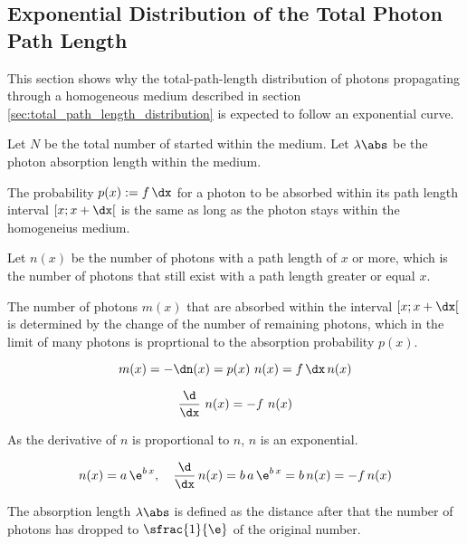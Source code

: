 
\subsection{Exponential Distribution of the Total Photon Path Length}
\label{sec:exponential_distribution}

This section shows why the total-path-length distribution of photons propagating through a homogeneous medium described in section \ref{sec:total_path_length_distribution} is expected to follow an exponential curve.


Let $N$ be the total number of started within the medium. Let $\lambda\abs$ be the photon absorption length within the medium.

The probability $p(x):=f\,\dx$ for a photon to be absorbed within its path length interval $[x; x + \dx[$ is the same as long as the photon stays within the homogeneius medium.

Let $n(x)$ be the number of photons with a path length of $x$ or more, which is the number of photons that still exist with a path length greater or equal $x$.

The number of photons $m(x)$ that are absorbed within the interval $[x; x + \dx[$ is determined by the change of the number of remaining photons, which in the limit of many photons is proprtional to the absorption probability $p(x)$.

$$ m(x) = -\dn(x) = p(x)\ n(x) = f\,\dx\,n(x) $$

$$ \frac{\d}{\dx}\ n(x) = -f\ n(x) $$

As the derivative of $n$ is proportional to $n$, $n$ is an exponential.

$$
  n(x) = a\,\e^{b\,x}, \ \ \
  \frac{\d}{\dx}\,n(x) = b\,a\,\e^{b\,x} = b\,n(x) = -f\,n(x)
$$

%

The absorption length $\lambda\abs$ is defined as the distance after that the number of photons has dropped to $\sfrac{1}{\e}$ of the original number.

